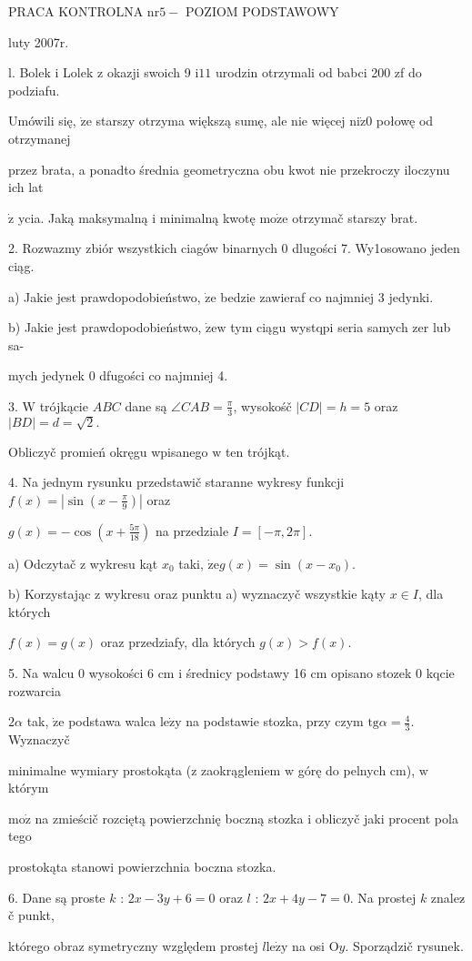 \documentclass[a4paper,12pt]{article}
\begin{document}
PRACA KONTROLNA $\mathrm{n}\mathrm{r}5-$ POZIOM PODSTAWOWY

luty 2007r.

l. Bolek $\mathrm{i}$ Lolek $\mathrm{z}$ okazji swoich 9 $\mathrm{i} 11$ urodzin otrzymali od babci 200 zf do podziafu.

Umówili się, $\dot{\mathrm{z}}\mathrm{e}$ starszy otrzyma większą sumę, ale nie więcej $\mathrm{n}\mathrm{i}\dot{\mathrm{z}}0$ połowę od otrzymanej

przez brata, a ponadto średnia geometryczna obu kwot nie przekroczy iloczynu ich lat

$\dot{\mathrm{z}}$ ycia. Jaką maksymalną $\mathrm{i}$ minimalną kwotę $\mathrm{m}\mathrm{o}\dot{\mathrm{z}}\mathrm{e}$ otrzymač starszy brat.

2. Rozwazmy zbiór wszystkich ciagów binarnych $0$ dlugości 7. Wy1osowano jeden ciąg.

a) Jakie jest prawdopodobieństwo, $\dot{\mathrm{z}}\mathrm{e}$ bedzie zawieraf co najmniej 3 jedynki.

b) Jakie jest prawdopodobieństwo, $\dot{\mathrm{z}}\mathrm{e}\mathrm{w}$ tym ciągu wystqpi seria samych zer lub sa-

mych jedynek $0$ dfugości co najmniej 4.

3. $\mathrm{W}$ trójkącie $ABC$ dane są $\displaystyle \angle CAB=\frac{\pi}{3}$, wysokośč $|CD| =h=5$ oraz $|BD| =d=\sqrt{2}.$

Obliczyč promień okręgu wpisanego $\mathrm{w}$ ten trójkąt.

4. Na jednym rysunku przedstawič staranne wykresy funkcji $f(x) = |\displaystyle \sin(x-\frac{\pi}{9})|$ oraz

$g(x)=-\displaystyle \cos(x+\frac{5\pi}{18})$ na przedziale $I=[-\pi,2\pi].$

a) Odczytač $\mathrm{z}$ wykresu kąt $x_{0}$ taki, $\dot{\mathrm{z}}\mathrm{e}g(x)=\sin(x-x_{0}).$

b) Korzystając $\mathrm{z}$ wykresu oraz punktu a) wyznaczyč wszystkie kąty $x\in I$, dla których

$f(x)=g(x)$ oraz przedziafy, dla których $g(x)>f(x).$

5. Na walcu $0$ wysokości 6 cm $\mathrm{i}$ średnicy podstawy 16 cm opisano stozek $0$ kqcie rozwarcia

$ 2\alpha$ tak, $\dot{\mathrm{z}}\mathrm{e}$ podstawa walca $\mathrm{l}\mathrm{e}\dot{\mathrm{z}}\mathrm{y}$ na podstawie stozka, przy czym $\mathrm{t}\mathrm{g}\alpha= \displaystyle \frac{4}{3}$. Wyznaczyč

minimalne wymiary prostokąta ($\mathrm{z}$ zaokrągleniem $\mathrm{w}$ górę do pelnych cm), $\mathrm{w}$ którym

$\mathrm{m}\mathrm{o}\dot{\mathrm{z}}$ na zmieścič rozciętą powierzchnię boczną stozka $\mathrm{i}$ obliczyč jaki procent pola tego

prostokąta stanowi powierzchnia boczna stozka.

6. Dane są proste $k$ : $2x-3y+6=0$ oraz $l$ : $2x+4y-7=0$. Na prostej $k$ znalez$\acute{}$č punkt,

którego obraz symetryczny względem prostej $l\mathrm{l}\mathrm{e}\dot{\mathrm{z}}\mathrm{y}$ na osi $\mathrm{O}y$. Sporządzič rysunek.
\end{document}
